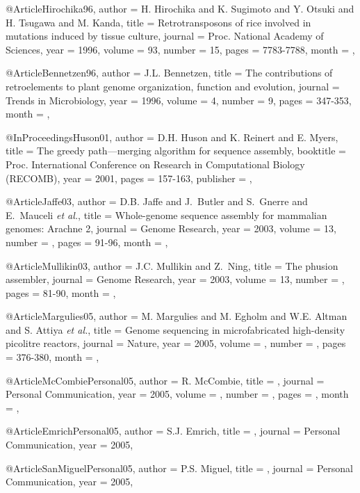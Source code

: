 @Article{Hirochika96,
  author =   {H. Hirochika and K. Sugimoto and Y. Otsuki and H. Tsugawa and M. Kanda},
  title =    {Retrotransposons of rice involved in mutations induced by tissue culture},
  journal =  {Proc. National Academy of Sciences},
  year =     {1996},
  volume =   {93},
  number =   {15},
  pages =    {7783-7788},
  month =    {},
}

@Article{Bennetzen96,
  author =   {J.L. Bennetzen},
  title =    {The contributions of retroelements to plant genome organization, function and evolution},
  journal =  {Trends in Microbiology},
  year =     {1996},
  volume =   {4},
  number =   {9},
  pages =    {347-353},
  month =    {},
}


@InProceedings{Huson01,
  author =   {D.H. Huson and K. Reinert and E. Myers},
  title =    {The greedy path—merging algorithm for sequence assembly},
  booktitle =  {{Proc. International Conference on Research in Computational Biology (RECOMB)}},
  year =     {2001},
  pages =	{157-163},
  publisher =   {},
}


@Article{Jaffe03,
  author =   {D.B. Jaffe and J.~Butler and S.~Gnerre and E.~Mauceli {\it et al.}},
  title =    {{Whole-genome sequence assembly for mammalian genomes: Arachne 2}},
  journal =  {Genome Research},
  year =     {2003},
  volume =   {13},
  number =   {},
  pages =    {91-96},
  month =    {},
}


@Article{Mullikin03,
  author =   {J.C. Mullikin and Z.~Ning},
  title =    {The phusion assembler},
  journal =  {Genome Research},
  year =     {2003},
  volume =   {13},
  number =   {},
  pages =    {81-90},
  month =    {},
}


@Article{Margulies05,
  author =   {M. Margulies and M. Egholm and W.E. Altman and S. Attiya {\it et al.}},
  title =    {Genome sequencing in microfabricated high-density picolitre reactors},
  journal =  {Nature},
  year =     {2005},
  volume =   {},
  number =   {},
  pages =    {376-380},
  month =    {},
}


@Article{McCombiePersonal05,
  author =   {R. McCombie},
  title =    {},
  journal =  {Personal Communication},
  year =     {2005},
  volume =   {},
  number =   {},
  pages =    {},
  month =    {},
}

@Article{EmrichPersonal05,
  author =   {S.J. Emrich},
  title =    {},
  journal =  {Personal Communication},
  year =     {2005},
}

@Article{SanMiguelPersonal05,
  author =   {P.S. Miguel},
  title =    {},
  journal =  {Personal Communication},
  year =     {2005},
}


